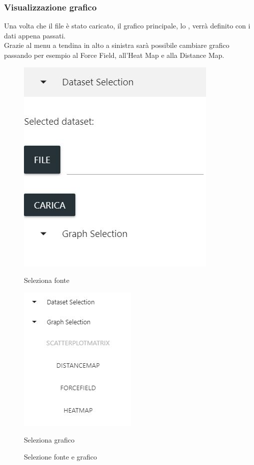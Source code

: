 \documentclass[../manuale_utente.tex]{subfiles}
\begin{document}
\subsubsection{Visualizzazione grafico}
    \label{subsub:vis_graf}
Una volta che il file è stato caricato, il grafico principale, lo , verrà definito con i dati appena passati. \\
Grazie al menu a tendina in alto a sinistra sarà possibile cambiare grafico passando per esempio al Force Field, all’Heat Map e alla Distance Map.

\begin{figure}
	\centering
	\begin{minipage}{.5\textwidth}
	  \centering
	  \includegraphics[width=.5\linewidth]{img/seleziona_dataset.jpg}
	  \caption{Seleziona fonte}
	  \label{fig:sub1}
	\end{minipage}%
	\begin{minipage}{.5\textwidth}
	  \centering
	  \includegraphics[width=.5\linewidth]{img/seleziona_grafico.jpg}
	  \caption{Seleziona grafico}
	  \label{fig:sub2}
	\end{minipage}
	\caption{Selezione fonte e grafico}
	\label{fig:test}
\end{figure}
\end{document}
